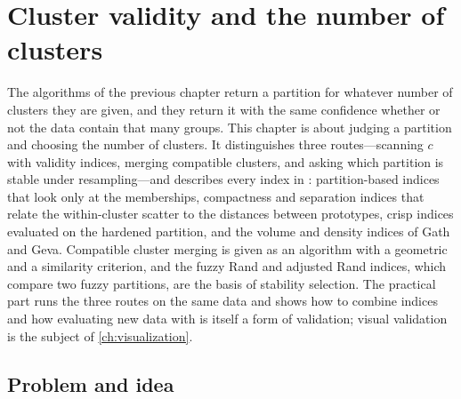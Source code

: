 \chapter[Cluster validity]{Cluster validity and the number of clusters}\label{ch:validity}
\begin{roadmap}
The algorithms of the previous chapter return a partition for whatever number of clusters they are given, and they return it with the same confidence whether or not the data contain that many groups. This chapter is about judging a partition and choosing the number of clusters. It distinguishes three routes---scanning $c$ with validity indices, merging compatible clusters, and asking which partition is stable under resampling---and describes every index in : partition-based indices that look only at the memberships, compactness and separation indices that relate the within-cluster scatter to the distances between prototypes, crisp indices evaluated on the hardened partition, and the volume and density indices of Gath and Geva. Compatible cluster merging is given as an algorithm with a geometric and a similarity criterion, and the fuzzy Rand and adjusted Rand indices, which compare two fuzzy partitions, are the basis of stability selection. The practical part runs the three routes on the same data and shows how to combine indices and how evaluating new data with  is itself a form of validation; visual validation is the subject of \cref{ch:visualization}.
\end{roadmap}

\section{Problem and idea}\label{sec:val:problem}

